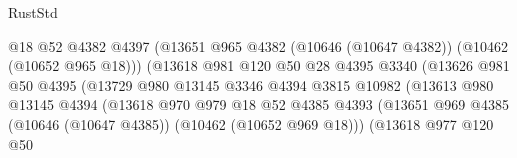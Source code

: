 \begin{lexlean}{RustStd}
\begin{coremodule}
                                          @18
                                          @52
                                          @4382
                                          @4397
                                          (@13651
                                            @965
                                            @4382
                                            (@10646 (@10647 @4382))
                                            (@10462 (@10652 @965 @18)))
                                          (@13618
                                            @981
                                            @120
                                            @50
                                            @28
                                            @4395
                                            @3340
                                            (@13626
                                              @981
                                              @50
                                              @4395
                                              (@13729
                                                @980
                                                @13145
                                                @3346
                                                @4394
                                                @3815
                                                @10982
                                                (@13613
                                                  @980
                                                  @13145
                                                  @4394
                                                  (@13618
                                                    @970
                                                    @979
                                                    @18
                                                    @52
                                                    @4385
                                                    @4393
                                                    (@13651
                                                      @969
                                                      @4385
                                                      (@10646 (@10647 @4385))
                                                      (@10462 (@10652 @969 @18)))
                                                    (@13618
                                                      @977
                                                      @120
                                                      @50

\end{coremodule}
\end{lexlean}
